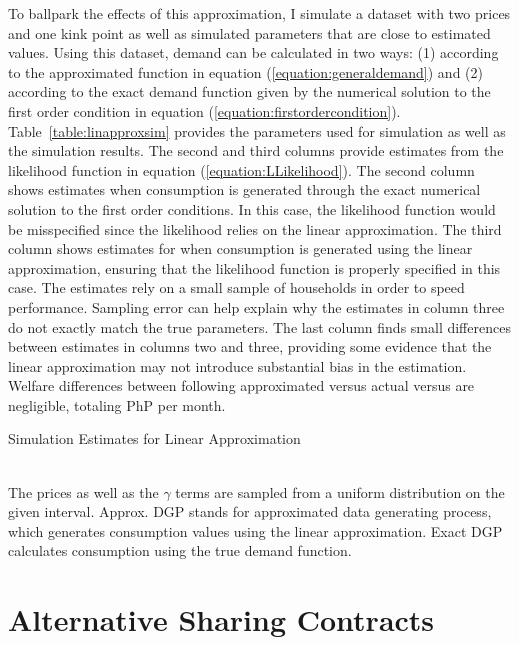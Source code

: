 \documentclass[12pt]{article}
\begin{document}
\begin{appendices}
To ballpark the effects of this approximation, I simulate a dataset with two prices and one kink point as well as simulated parameters that are close to estimated values.  Using this dataset, demand can be calculated in two ways: (1) according to the approximated function in equation (\ref{equation:generaldemand}) and (2) according to the exact demand function given by the numerical solution to the first order condition in equation (\ref{equation:firstordercondition}).  Table~\ref{table:linapproxsim} provides the parameters used for simulation as well as the simulation results.  The second and third columns provide estimates from the likelihood function in equation (\ref{equation:LLikelihood}).  The second column shows estimates when consumption is generated through the exact numerical solution to the first order conditions.  In this case, the likelihood function would be misspecified since the likelihood relies on the linear approximation.  The third column shows estimates for when consumption is generated using the linear approximation, ensuring that the likelihood function is properly specified in this case.  The estimates rely on a small sample of households in order to speed performance.  Sampling error can help explain why the estimates in column three do not exactly match the true parameters.  The last column finds small differences between estimates in columns two and three, providing some evidence that the linear approximation may not introduce substantial bias in the estimation.  Welfare differences between following  approximated versus actual versus are negligible, totaling PhP per month.

\begin{table}
\caption{Simulation Estimates for Linear Approximation}\label{table:linapproxsim}
\centering
 \\
\footnotesize{The prices as well as the $\gamma$ terms are sampled from a uniform distribution on the given interval.  Approx. DGP stands for approximated data generating process, which generates consumption values using the linear approximation.  Exact DGP calculates consumption using the true demand function.   }
\end{table}



\section{Alternative Sharing Contracts}\label{appendix:fixedprice}


\end{appendices}
\end{document}
